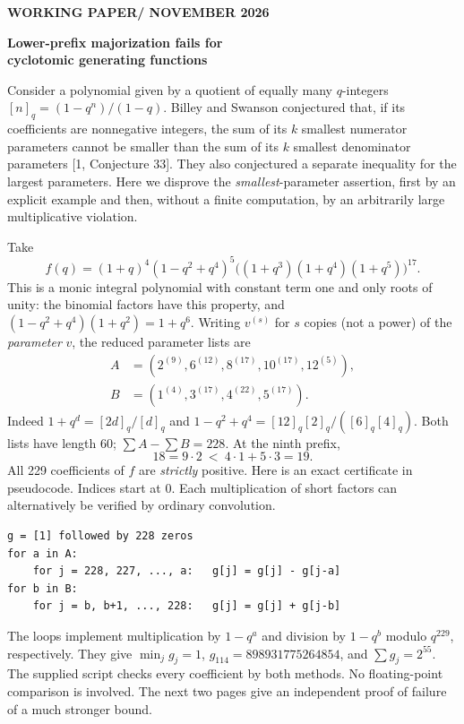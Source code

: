 \documentclass[11pt]{article}
\newcommand{\sect}[1]{\vspace{4pt}{\large\bfseries\color{ink}#1}\par}
\begin{document}
{\small\sffamily\bfseries\color{accent} WORKING PAPER\quad / NOVEMBER 2026}\par
{\LARGE\bfseries\color{ink} Lower-prefix majorization fails for\\[2pt]cyclotomic generating functions}\par
Consider a polynomial given by a quotient of equally many $q$-integers $[n]_q=(1-q^n)/(1-q)$. Billey and Swanson conjectured that, if its coefficients are nonnegative integers, the sum of its $k$ smallest numerator parameters cannot be smaller than the sum of its $k$ smallest denominator parameters [1, Conjecture 33]. They also conjectured a separate inequality for the largest parameters. Here we disprove the \emph{smallest}-parameter assertion, first by an explicit example and then, without a finite computation, by an arbitrarily large multiplicative violation.

\sect{1. An explicit counterexample}
Take
\[
 f(q)=(1+q)^4(1-q^2+q^4)^5
       \bigl((1+q^3)(1+q^4)(1+q^5)\bigr)^{17}.
\]
This is a monic integral polynomial with constant term one and only roots of unity: the binomial factors have this property, and $(1-q^2+q^4)(1+q^2)=1+q^6$. Writing $v^{(s)}$ for $s$ copies (not a power) of the \emph{parameter} $v$, the reduced parameter lists are
\[
\begin{aligned}
 A&=(2^{(9)},6^{(12)},8^{(17)},10^{(17)},12^{(5)}),\\
 B&=(1^{(4)},3^{(17)},4^{(22)},5^{(17)}).
\end{aligned}
\]
Indeed $1+q^d=[2d]_q/[d]_q$ and $1-q^2+q^4=[12]_q[2]_q/([6]_q[4]_q)$. Both lists have length 60; $\sum A-\sum B=228$. At the ninth prefix,
\[
 18=9\cdot2\ <\ 4\cdot1+5\cdot3=19.
\]
All 229 coefficients of $f$ are \emph{strictly} positive. Here is an exact certificate in pseudocode. Indices start at 0. Each multiplication of short factors can alternatively be verified by ordinary convolution.
\begin{verbatim}
g = [1] followed by 228 zeros
for a in A:
    for j = 228, 227, ..., a:   g[j] = g[j] - g[j-a]
for b in B:
    for j = b, b+1, ..., 228:   g[j] = g[j] + g[j-b]
\end{verbatim}
The loops implement multiplication by $1-q^a$ and division by $1-q^b$ modulo $q^{229}$, respectively. They give $\min_j g_j=1$, $g_{114}=898931775264854$, and $\sum g_j=2^{55}$. The supplied script checks every coefficient by both methods. No floating-point comparison is involved. The next two pages give an independent proof of failure of a much stronger bound.
\end{document}
